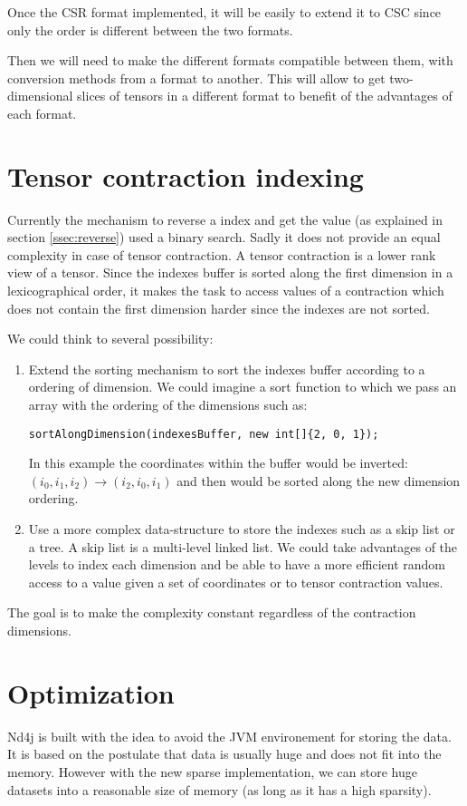 Once the CSR format implemented, it will be easily to extend it to CSC since only the order is different between the two formats.

Then we will need to make the different formats compatible between them, with conversion methods from a format to another. This will allow to get two-dimensional slices of tensors in a different format to benefit of the advantages of each format.

\section{Tensor contraction indexing}

Currently the mechanism to reverse a index and get the value (as explained in section \ref{ssec:reverse}) used a binary search. Sadly it does not provide an equal complexity in case of tensor contraction. A tensor contraction is a lower rank view of a tensor. Since the indexes buffer is sorted along the first dimension in a lexicographical order, it makes the task to access values of a contraction which does not contain the first dimension harder since the indexes are not sorted.

We could think to several possibility:
\begin{enumerate}
	\item Extend the sorting mechanism to sort the indexes buffer according to a ordering of dimension. We could imagine a sort function to which we pass an array with the ordering of the dimensions such as:
	\begin{lstlisting}[style=nonumbers]
		sortAlongDimension(indexesBuffer, new int[]{2, 0, 1});
	\end{lstlisting}
	In this example the coordinates within the buffer would be inverted:\\
	\qquad $(i_{0}, i_{1}, i_{2})  \rightarrow (i_{2}, i_{0}, i_{1})$  
	and then would be sorted along the new dimension ordering.
	\item Use a more complex data-structure to store the indexes such as a skip list or a tree. A skip list is a multi-level linked list. We could take advantages of the levels to index each dimension and be able to have a more efficient random access to a value given a set of coordinates or to tensor contraction values.
\end{enumerate} 

The goal is to make the complexity constant regardless of the contraction dimensions.


\section{Optimization}
Nd4j is built with the idea to avoid the JVM environement for storing the data. It is based on the postulate that data is usually huge and does not fit into the memory. However with the new sparse implementation, we can store huge datasets into a reasonable size of memory (as long as it has a high sparsity).

